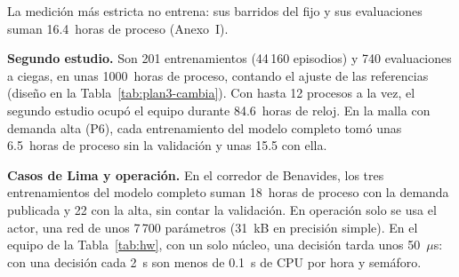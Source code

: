 La medición más estricta no entrena: sus barridos del fijo y sus
evaluaciones suman 16.4~horas de proceso (Anexo~I).

\noindent\textbf{Segundo estudio.} Son 201 entrenamientos
(44\,160 episodios) y 740 evaluaciones a ciegas, en unas 1000~horas de
proceso, contando el ajuste de las referencias (diseño en la
Tabla~\ref{tab:plan3-cambia}).
Con hasta 12 procesos a la vez, el segundo estudio ocupó el equipo
durante 84.6~horas de reloj. En la malla con demanda alta (P6), cada
entrenamiento del modelo completo tomó unas 6.5~horas de proceso sin la
validación y unas 15.5 con ella.

\noindent\textbf{Casos de Lima y operación.} En el corredor de
Benavides, los tres entrenamientos del modelo completo suman 18~horas
de proceso con la demanda publicada y 22 con la alta, sin contar la
validación. En operación solo se usa el actor, una red de unos
7\,700 parámetros (31~kB en precisión simple). En el equipo de la
Tabla~\ref{tab:hw}, con un solo núcleo, una decisión tarda unos
50~$\mu$s: con una decisión cada 2~s son menos de 0.1~s de CPU por hora
y semáforo.


